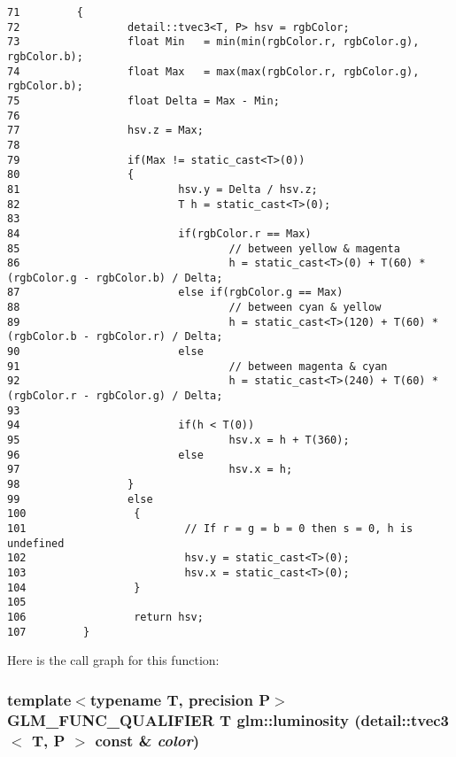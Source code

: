 \begin{Code}\begin{verbatim}71         {
72                 detail::tvec3<T, P> hsv = rgbColor;
73                 float Min   = min(min(rgbColor.r, rgbColor.g), rgbColor.b);
74                 float Max   = max(max(rgbColor.r, rgbColor.g), rgbColor.b);
75                 float Delta = Max - Min;
76 
77                 hsv.z = Max;                               
78 
79                 if(Max != static_cast<T>(0))
80                 {
81                         hsv.y = Delta / hsv.z;    
82                         T h = static_cast<T>(0);
83 
84                         if(rgbColor.r == Max)
85                                 // between yellow & magenta
86                                 h = static_cast<T>(0) + T(60) * (rgbColor.g - rgbColor.b) / Delta;
87                         else if(rgbColor.g == Max)
88                                 // between cyan & yellow
89                                 h = static_cast<T>(120) + T(60) * (rgbColor.b - rgbColor.r) / Delta;
90                         else
91                                 // between magenta & cyan
92                                 h = static_cast<T>(240) + T(60) * (rgbColor.r - rgbColor.g) / Delta;
93 
94                         if(h < T(0)) 
95                                 hsv.x = h + T(360);
96                         else
97                                 hsv.x = h;
98                 }
99                 else
100                 {
101                         // If r = g = b = 0 then s = 0, h is undefined
102                         hsv.y = static_cast<T>(0);
103                         hsv.x = static_cast<T>(0);
104                 }
105 
106                 return hsv;
107         }
\end{verbatim}
\end{Code}




Here is the call graph for this function:\hypertarget{group__gtx__color__space_gdd1c8feae48a4fcf9e575648b25b914f}{
\subsubsection[luminosity]{\setlength{\rightskip}{0pt plus 5cm}template$<$typename T, precision P$>$ GLM\_\-FUNC\_\-QUALIFIER T glm::luminosity (detail::tvec3$<$ T, P $>$ const \& {\em color})}}
\label{group__gtx__color__space_gdd1c8feae48a4fcf9e575648b25b914f}


